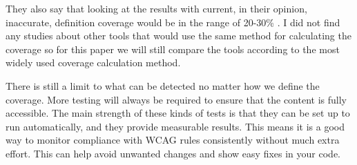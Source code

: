 \documentclass{master_thesis}
\begin{document}
They also say that looking at the results with current, in their opinion, inaccurate, definition coverage would be in the range of 20-30\% \citep{DequeSystems2021report}. I did not find any studies about other tools that would use the same method for calculating the coverage so for this paper we will still compare the tools according to the most widely used coverage calculation method.

There is still a limit to what can be detected no matter how we define the coverage. More testing will always be required to ensure that the content is fully accessible. The main strength of these kinds of tests is that they can be set up to run automatically, and they provide measurable results. This means it is a good way to monitor compliance with WCAG rules consistently without much extra effort. This can help avoid unwanted changes and show easy fixes in your code.

\end{document}
